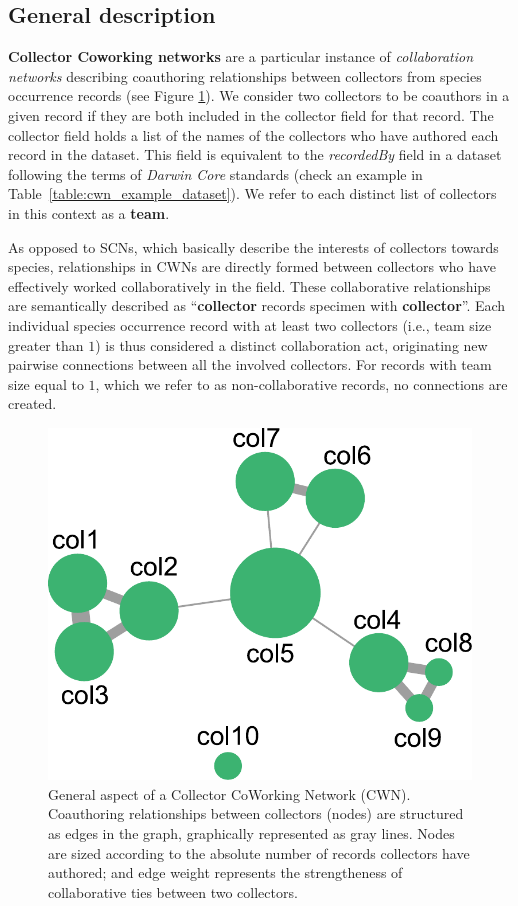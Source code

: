 {\subsection{General description}
\textbf{Collector Coworking networks} are a particular instance of \textit{collaboration networks} describing coauthoring relationships between collectors from species occurrence records (see Figure \ref{fig:cwn_general}).
We consider two collectors to be coauthors in a given record if they are both included in the collector field for that record. The collector field holds a list of the names of the collectors who have authored each record in the dataset. This field is equivalent to the \textit{recordedBy} field in a dataset following the terms of \textit{Darwin Core} standards (check an example in Table~\ref{table:cwn_example_dataset}). We refer to each distinct list of collectors in this context as a \textbf{team}.

As opposed to SCNs, which basically describe the interests of collectors towards species, relationships in CWNs are directly formed between collectors who have effectively worked collaboratively in the field. These collaborative relationships are semantically described as ``\textbf{collector} records specimen with \textbf{collector}''.
Each individual species occurrence record with at least two collectors (i.e., team size greater than $1$) is thus considered a distinct collaboration act, originating new pairwise connections between all the involved collectors.
For records with team size equal to $1$, which we refer to as non-collaborative records, no connections are created.

  \begin{figure}[h!]
  	\centering
    \includegraphics[width=.4\linewidth]{figures/network_models/cwn_generalaspect.pdf}
    \caption[General illustration of a Collector CoWorking Network (CWN).]{General aspect of a Collector CoWorking Network (CWN). Coauthoring relationships between collectors (nodes) are structured as edges in the graph, graphically represented as gray lines.
    Nodes are sized according to the absolute number of records collectors have authored; and edge weight represents the strengtheness of collaborative ties between two collectors.}
    \label{fig:cwn_general}
  \end{figure}

}
